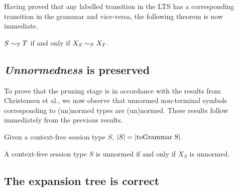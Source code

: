 Having proved that any labelled transition in the LTS has a corresponding
transition in the grammar and vice-versa, the following theorem is now
immediate.

\begin{theorem}
  \label{cfst_vs_grammar}
  $S\sim_\mathcal T T$  if and only if $ X_S \sim_\mathcal P X_T$.
\end{theorem}

\subsection{\textit{Unnormedness} is preserved}

To prove that the pruning stage is in accordance with the results
from Christensen et al., we now observe that unnormed non-terminal symbols
corresponding to (un)normed types are (un)normed. These results follow
immediately from the previous results.

\begin{corollary}
	Given a context-free session type $S$, $|S| = |\text{\lstinline{toGrammar S}}|$.
\end{corollary}

\begin{corollary}
	A context-free session type $S$ is unnormed if and only if
	$X_S$ is unnormed.
\end{corollary}

\subsection{The expansion tree is correct}
%
%
%

